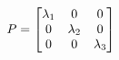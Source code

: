 \documentclass[preview]{standalone}
\begin{document}
\begin{align*}
\special{dvisvgm:raw <g id='unique000'>}
        P =
        \begin{bmatrix}
        \lambda_1 & 0 & 0\\
        0 & \lambda_2 & 0\\
        0 & 0 & \lambda_3
        \end{bmatrix}
        \special{dvisvgm:raw </g>}
\end{align*}
\end{document}
